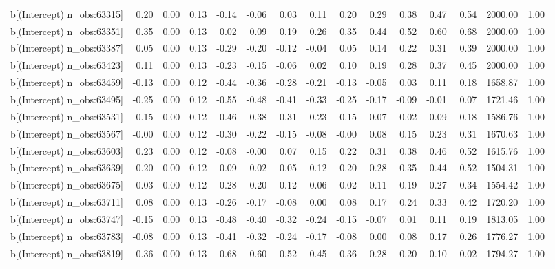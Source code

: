 \begin{table}[ht]
\begin{tabular}{rrrrrrrrrrrrrrr}
  b[(Intercept) n\_obs:63315] & 0.20 & 0.00 & 0.13 & -0.14 & -0.06 & 0.03 & 0.11 & 0.20 & 0.29 & 0.38 & 0.47 & 0.54 & 2000.00 & 1.00 \\ 
  b[(Intercept) n\_obs:63351] & 0.35 & 0.00 & 0.13 & 0.02 & 0.09 & 0.19 & 0.26 & 0.35 & 0.44 & 0.52 & 0.60 & 0.68 & 2000.00 & 1.00 \\ 
  b[(Intercept) n\_obs:63387] & 0.05 & 0.00 & 0.13 & -0.29 & -0.20 & -0.12 & -0.04 & 0.05 & 0.14 & 0.22 & 0.31 & 0.39 & 2000.00 & 1.00 \\ 
  b[(Intercept) n\_obs:63423] & 0.11 & 0.00 & 0.13 & -0.23 & -0.15 & -0.06 & 0.02 & 0.10 & 0.19 & 0.28 & 0.37 & 0.45 & 2000.00 & 1.00 \\ 
  b[(Intercept) n\_obs:63459] & -0.13 & 0.00 & 0.12 & -0.44 & -0.36 & -0.28 & -0.21 & -0.13 & -0.05 & 0.03 & 0.11 & 0.18 & 1658.87 & 1.00 \\ 
  b[(Intercept) n\_obs:63495] & -0.25 & 0.00 & 0.12 & -0.55 & -0.48 & -0.41 & -0.33 & -0.25 & -0.17 & -0.09 & -0.01 & 0.07 & 1721.46 & 1.00 \\ 
  b[(Intercept) n\_obs:63531] & -0.15 & 0.00 & 0.12 & -0.46 & -0.38 & -0.31 & -0.23 & -0.15 & -0.07 & 0.02 & 0.09 & 0.18 & 1586.76 & 1.00 \\ 
  b[(Intercept) n\_obs:63567] & -0.00 & 0.00 & 0.12 & -0.30 & -0.22 & -0.15 & -0.08 & -0.00 & 0.08 & 0.15 & 0.23 & 0.31 & 1670.63 & 1.00 \\ 
  b[(Intercept) n\_obs:63603] & 0.23 & 0.00 & 0.12 & -0.08 & -0.00 & 0.07 & 0.15 & 0.22 & 0.31 & 0.38 & 0.46 & 0.52 & 1615.76 & 1.00 \\ 
  b[(Intercept) n\_obs:63639] & 0.20 & 0.00 & 0.12 & -0.09 & -0.02 & 0.05 & 0.12 & 0.20 & 0.28 & 0.35 & 0.44 & 0.52 & 1504.31 & 1.00 \\ 
  b[(Intercept) n\_obs:63675] & 0.03 & 0.00 & 0.12 & -0.28 & -0.20 & -0.12 & -0.06 & 0.02 & 0.11 & 0.19 & 0.27 & 0.34 & 1554.42 & 1.00 \\ 
  b[(Intercept) n\_obs:63711] & 0.08 & 0.00 & 0.13 & -0.26 & -0.17 & -0.08 & 0.00 & 0.08 & 0.17 & 0.24 & 0.33 & 0.42 & 1720.20 & 1.00 \\ 
  b[(Intercept) n\_obs:63747] & -0.15 & 0.00 & 0.13 & -0.48 & -0.40 & -0.32 & -0.24 & -0.15 & -0.07 & 0.01 & 0.11 & 0.19 & 1813.05 & 1.00 \\ 
  b[(Intercept) n\_obs:63783] & -0.08 & 0.00 & 0.13 & -0.41 & -0.32 & -0.24 & -0.17 & -0.08 & 0.00 & 0.08 & 0.17 & 0.26 & 1776.27 & 1.00 \\ 
  b[(Intercept) n\_obs:63819] & -0.36 & 0.00 & 0.13 & -0.68 & -0.60 & -0.52 & -0.45 & -0.36 & -0.28 & -0.20 & -0.10 & -0.02 & 1794.27 & 1.00 \\ 

\end{tabular}
\end{table}

